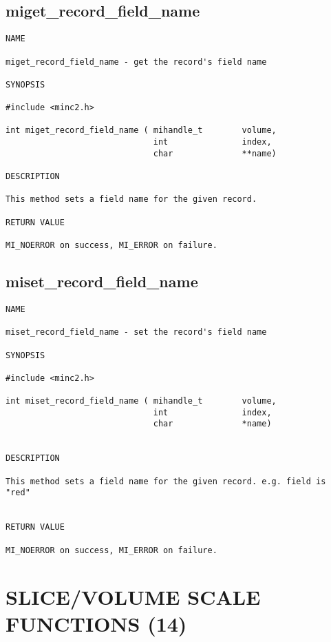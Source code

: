 \documentclass{article}
\begin{document}
\subsection{miget\_record\_field\_name}
\begin{verbatim}
NAME

miget_record_field_name - get the record's field name

SYNOPSIS

#include <minc2.h>

int miget_record_field_name ( mihandle_t        volume,
                              int               index,
                              char              **name)

DESCRIPTION

This method sets a field name for the given record.

RETURN VALUE

MI_NOERROR on success, MI_ERROR on failure.
\end{verbatim}

\subsection{miset\_record\_field\_name}
\begin{verbatim}
NAME

miset_record_field_name - set the record's field name

SYNOPSIS

#include <minc2.h>

int miset_record_field_name ( mihandle_t        volume,
                              int               index,
                              char              *name)
                                

DESCRIPTION

This method sets a field name for the given record. e.g. field is "red"


RETURN VALUE

MI_NOERROR on success, MI_ERROR on failure.
\end{verbatim}

\section{SLICE/VOLUME SCALE FUNCTIONS (14)}
\end{document}
